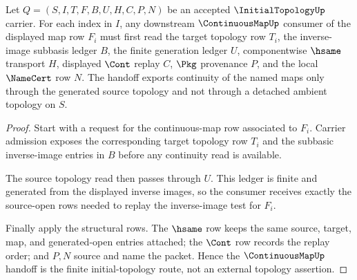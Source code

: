 \begin{theorem}
\label{thm:initial-topology-continuous-map-handoff}
Let $Q=(S,I,T,F,B,U,H,C,P,N)$ be an accepted $\InitialTopologyUp$ carrier. For each index in $I$, any downstream $\ContinuousMapUp$ consumer of the displayed map row $F_i$ must first read the target topology row $T_i$, the inverse-image subbasis ledger $B$, the finite generation ledger $U$, componentwise $\hsame$ transport $H$, displayed $\Cont$ replay $C$, $\Pkg$ provenance $P$, and the local $\NameCert$ row $N$. The handoff exports continuity of the named maps only through the generated source topology and not through a detached ambient topology on $S$.
\end{theorem}
\begin{proof}
Start with a request for the continuous-map row associated to $F_i$. Carrier admission exposes the corresponding target topology row $T_i$ and the subbasic inverse-image entries in $B$ before any continuity read is available.

The source topology read then passes through $U$. This ledger is finite and generated from the displayed inverse images, so the consumer receives exactly the source-open rows needed to replay the inverse-image test for $F_i$.

Finally apply the structural rows. The $\hsame$ row keeps the same source, target, map, and generated-open entries attached; the $\Cont$ row records the replay order; and $P,N$ source and name the packet. Hence the $\ContinuousMapUp$ handoff is the finite initial-topology route, not an external topology assertion.
\end{proof}


\begin{closurestatus}{\InitialTopologyUp}
  \theoryclosure{\seedClosure}
  \formalstatus{\unformalizedV}
\end{closurestatus}
